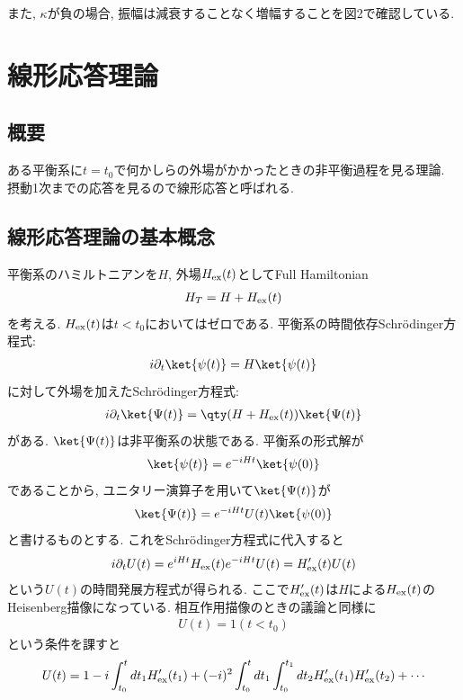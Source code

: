 \documentclass[10.5pt,a4paper]{jreport}
\begin{document}
また, $\kappa$が負の場合, 振幅は減衰することなく増幅することを図2で確認している.
\section{線形応答理論}
\subsection{概要}
ある平衡系に$t = t_0$で何かしらの外場がかかったときの非平衡過程を見る理論. 摂動1次までの応答を見るので線形応答と呼ばれる.
\subsection{線形応答理論の基本概念}
平衡系のハミルトニアンを$H$, 外場$H_{\rm ex}(t)$としてFull Hamiltonian
\begin{eqnarray}
  H_{T} = H + H_{\rm ex}(t)
\end{eqnarray}
を考える. $H_{\rm ex}(t)$は$t< t_0$においてはゼロである. 平衡系の時間依存Schr\"odinger方程式:
\begin{eqnarray}
  i\partial_t\ket{\psi(t)} = H\ket{\psi(t)}
\end{eqnarray}
に対して外場を加えたSchr\"odinger方程式:
\begin{eqnarray}
  i\partial_t\ket{\Psi(t)} = \qty(H + H_{\rm ex}(t))\ket{\Psi(t)}
\end{eqnarray}
がある. $\ket{\Psi(t)}$は非平衡系の状態である. 平衡系の形式解が
\begin{eqnarray}
  \ket{\psi(t)} = e^{-iHt}\ket{\psi(0)}
\end{eqnarray}
であることから, ユニタリー演算子を用いて$\ket{\Psi(t)}$が
\begin{eqnarray}
  \ket{\Psi(t)} = e^{-iHt}U(t)\ket{\psi(0)}
\end{eqnarray}
と書けるものとする. これをSchr\"odinger方程式に代入すると
\begin{eqnarray}
  i\partial_t U(t) = e^{iHt}H_{\rm ex}(t)e^{-iHt}U(t) = H'_{\rm ex}(t)U(t)
\end{eqnarray}
という$U(t)$の時間発展方程式が得られる. ここで$H'_{\rm ex}(t)$は$H$による$H_{\rm ex}(t)$のHeisenberg描像になっている. 相互作用描像のときの議論と同様に
\begin{eqnarray}
  U(t) = 1 (t < t_0)
\end{eqnarray}
という条件を課すと
\begin{eqnarray}
  U(t) = 1 -i\int_{t_0}^{t}dt_1H'_{\rm ex}(t_1) + (-i)^2\int_{t_0}^{t}dt_1\int_{t_0}^{t_1}dt_2H'_{\rm ex}(t_1)H'_{\rm ex}(t_2) + \cdots
\end{eqnarray}
\end{document}
